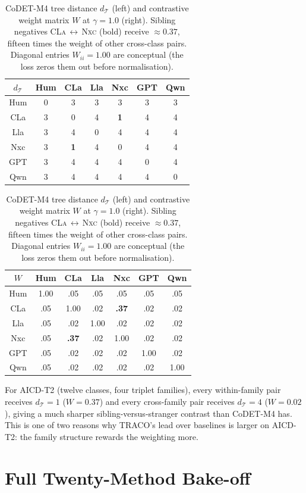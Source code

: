 ﻿\documentclass[11pt]{article}
\newcommand{\method}{\textsc{TRACO}\xspace}
\begin{document}
\begin{table}[t]
\centering\small
\setlength{\tabcolsep}{4pt}
\begin{tabular}{c|cccccc}
$d_\mathcal{T}$ & Hum & CLa & Lla & Nxc & GPT & Qwn \\
\hline
Hum  & 0 & 3 & 3 & 3 & 3 & 3 \\
CLa  & 3 & 0 & 4 & \textbf{1} & 4 & 4 \\
Lla  & 3 & 4 & 0 & 4 & 4 & 4 \\
Nxc  & 3 & \textbf{1} & 4 & 0 & 4 & 4 \\
GPT  & 3 & 4 & 4 & 4 & 0 & 4 \\
Qwn  & 3 & 4 & 4 & 4 & 4 & 0 \\
\end{tabular}
\hspace{2cm}
\begin{tabular}{c|cccccc}
$W$ & Hum & CLa & Lla & Nxc & GPT & Qwn \\
\hline
Hum  & 1.00 & .05 & .05 & .05 & .05 & .05 \\
CLa  & .05  & 1.00 & .02 & \textbf{.37} & .02 & .02 \\
Lla  & .05  & .02 & 1.00 & .02 & .02 & .02 \\
Nxc  & .05  & \textbf{.37} & .02 & 1.00 & .02 & .02 \\
GPT  & .05  & .02 & .02 & .02 & 1.00 & .02 \\
Qwn  & .05  & .02 & .02 & .02 & .02 & 1.00 \\
\end{tabular}
\caption{\label{tab:wmat}
CoDET-M4 tree distance $d_{\mathcal{T}}$ (left) and contrastive
weight matrix $W$ at $\gamma{=}1.0$ (right). Sibling negatives
\textsc{CLa}\,$\leftrightarrow$\,\textsc{Nxc} (bold) receive
$\approx\!0.37$, fifteen times the weight of other cross-class
pairs. Diagonal entries $W_{ii}{=}1.00$ are conceptual (the loss
zeros them out before normalisation).}
\end{table}

For AICD-T2 (twelve classes, four triplet families), every
within-family pair receives $d_{\mathcal{T}}{=}1$ ($W{=}0.37$) and
every cross-family pair receives $d_{\mathcal{T}}{=}4$ ($W{=}0.02$),
giving a much sharper sibling-versus-stranger contrast than
CoDET-M4 has. This is one of two reasons why \method's lead over
baselines is larger on AICD-T2: the family structure rewards the
weighting more.

\section{Full Twenty-Method Bake-off}
\label{app:bakeoff}
\end{document}
